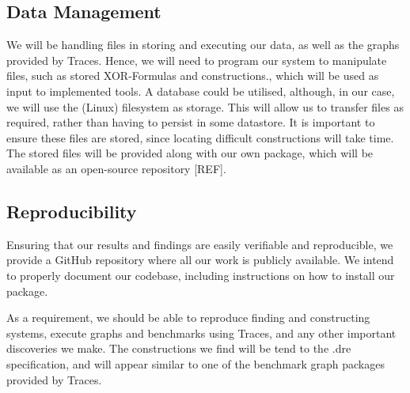 \subsection{Data Management}
We will be handling files in storing and executing our data, as well as the graphs provided by Traces. Hence, we will need to program our system to manipulate files, such as stored XOR-Formulas and constructions., which will be used as input to implemented tools. A database could be utilised, although, in our case, we will use the (Linux) filesystem as storage. This will allow us to transfer files as required, rather than having to persist in some datastore. It is important to ensure these files are stored, since locating difficult constructions will take time. The stored files will be provided along with our own package, which will be available as an open-source repository [REF].

\subsection{Reproducibility}
Ensuring that our results and findings are easily verifiable and reproducible, we provide a GitHub repository where all our work is publicly available. We intend to properly document our codebase, including instructions on how to install our package.
\par
As a requirement, we should be able to reproduce finding and constructing systems, execute graphs and benchmarks using Traces, and any other important discoveries we make. The constructions we find will be tend to the .dre specification, and will appear similar to one of the benchmark graph packages provided by Traces.

